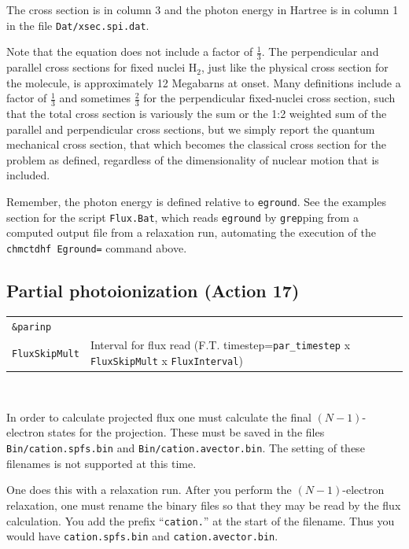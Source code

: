 \documentclass[10pt,leqno, oneside]{book}
\begin{document}
The cross section is in column 3 and the photon energy in Hartree is in column 1 in the file \verb#Dat/xsec.spi.dat#.

Note that the equation does not include a factor of $\frac{1}{3}$.  The perpendicular and parallel cross sections for fixed nuclei H$_2$,
just like the physical cross section for the molecule, is approximately 12 Megabarns at onset.  Many definitions include a factor of $\frac{1}{3}$
and sometimes $\frac{2}{3}$ for the perpendicular fixed-nuclei cross section, such that the total cross section is variously the sum or the
1:2 weighted sum of the parallel and perpendicular cross sections, but we simply report the
quantum mechanical cross section, that which becomes the classical cross section for the problem as defined, 
regardless of the dimensionality of nuclear motion that is included.

Remember, the photon energy is defined relative to \verb#eground#.  See the examples section for the script \verb#Flux.Bat#, which reads
\verb#eground# by \verb#grep#ping from a computed output file from a relaxation run, automating the execution of the 
\verb#chmctdhf Eground=# command above.

\subsection{Partial photoionization (Action 17)}

{\footnotesize
\begin{tabular}{ll}
\verb#&parinp# \\
\verb#FluxSkipMult#  & Interval for flux read (F.T. timestep=\verb#par_timestep# x \verb#FluxSkipMult# x \verb#FluxInterval#) \\
\end{tabular}}

\

In order to calculate projected flux one must calculate the final $(N-1)$-electron states for the projection.  These must be saved in
the files \verb#Bin/cation.spfs.bin# and \verb#Bin/cation.avector.bin#.  The setting of these filenames is not supported at this time.

One does this with a relaxation run.
After you perform the $(N-1)$-electron
relaxation, one must rename the binary files so that they may be read by the flux calculation.  You add the prefix ``\verb#cation.#'' at the start
of the filename.  Thus you would have \verb#cation.spfs.bin# and \verb#cation.avector.bin#.   

\
\end{document}
